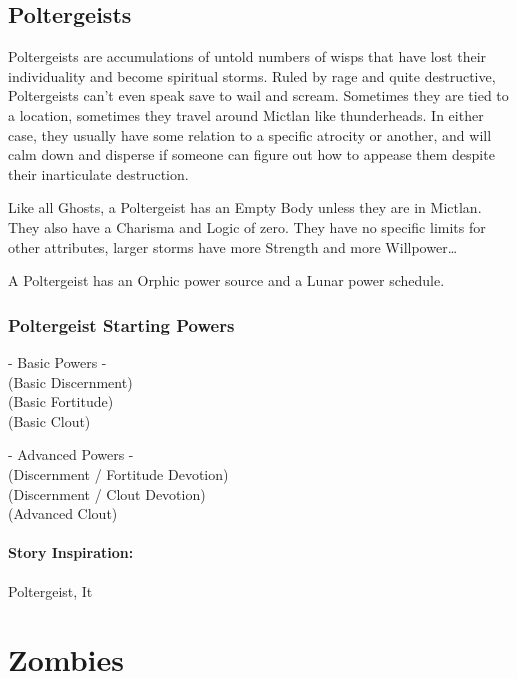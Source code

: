 \subsection{Poltergeists} 

Poltergeists are accumulations of untold numbers of wisps that have lost their individuality and become spiritual storms. Ruled by rage and quite destructive, Poltergeists can't even speak save to wail and scream. Sometimes they are tied to a location, sometimes they travel around Mictlan like thunderheads. In either case, they usually have some relation to a specific atrocity or another, and will calm down and disperse if someone can figure out how to appease them despite their inarticulate destruction.

Like all Ghosts, a Poltergeist has an Empty Body unless they are in Mictlan. They also have a Charisma and Logic of zero. They have no specific limits for other attributes, larger storms have more Strength and more Willpower\ldots{}

A Poltergeist has an Orphic power source and a Lunar power schedule.

\subsubsection{Poltergeist Starting Powers}

\hspace{\parindent} - Basic Powers -\\
 (Basic Discernment)\\
 (Basic Fortitude)\\
 (Basic Clout)

- Advanced Powers -\\
 (Discernment / Fortitude Devotion)\\
 (Discernment / Clout Devotion)\\
 (Advanced Clout)

\paragraph{Story Inspiration:} Poltergeist, It

\section{Zombies} 

